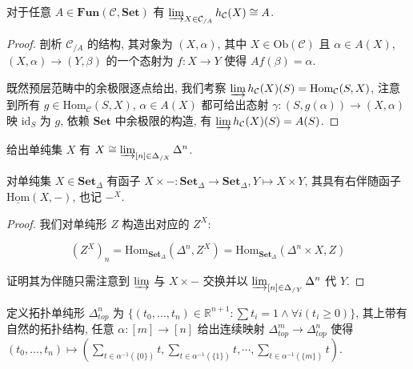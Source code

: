 \begin{lemma}
    对于任意 \(A \in \mathbf{Fun} (\mathcal{C},\mathbf{Set})\) 有 \(\varinjlim_{X \in \mathcal{C}_{/A}} h_{\mathcal{C}} (X) \cong A\).

    \begin{proof}
        剖析 \(\mathcal{C}_{/A}\) 的结构, 其对象为 \((X,\alpha)\), 其中 \(X \in \mathrm{Ob} (\mathcal{C})\) 且 \(\alpha \in A(X)\),
        \((X,\alpha) \to (Y,\beta)\) 的一个态射为 \(f : X \to Y\) 使得 \(Af (\beta) = \alpha\).

        既然预层范畴中的余极限逐点给出, 我们考察 \(\varinjlim h_{\mathcal{C}} (X) (S) = \mathrm{Hom}_{\mathcal{C}} (S,X)\),
        注意到所有 \(g \in \mathrm{Hom}_{\mathcal{C}} (S,X)\), \(\alpha \in A (X)\) 都可给出态射 \(\gamma : (S,g(\alpha)) \to (X,\alpha)\) 映 \(\mathrm{id}_S\) 为 \(g\),
        依赖 \(\mathbf{Set}\) 中余极限的构造, 有 \(\varinjlim h_{\mathcal{C}} (X) (S) = A (S)\).
    \end{proof}
\end{lemma}

\begin{corollary}
    给出单纯集 \(X\) 有 \(X \cong \varinjlim_{[n] \in \Delta_{/X}} \Delta^n\).
\end{corollary}

\begin{lemma}
    对单纯集 \(X \in \mathbf{Set}_{\Delta}\) 有函子 \(X \times - : \mathbf{Set}_{\Delta} \to \mathbf{Set}_{\Delta}, Y \mapsto X \times Y\),
    其具有右伴随函子 \(\underline{\mathrm{Hom}} (X, -)\), 也记 \(-^X\).

    \begin{proof}
        我们对单纯形 \(Z\) 构造出对应的 \(Z^X\):

        \[
            {(Z^X)}_n = \mathrm{Hom}_{\mathbf{Set}_{\Delta}} (\Delta^n, Z^X) = \mathrm{Hom}_{\mathbf{Set}_{\Delta}} (\Delta^n \times X, Z)
        \]

        证明其为伴随只需注意到 \(\varinjlim\) 与 \(X \times -\) 交换并以 \(\varinjlim_{[n] \in \Delta_{/Y}} \Delta^n\) 代 \(Y\).
    \end{proof}
\end{lemma}

\begin{definition}
    定义拓扑单纯形 \(\Delta^n_{top}\) 为 \(\{(t_0,\ldots,t_n) \in \mathbb{R}^{n+1} : \sum t_i = 1 \land \forall i (t_i \geq 0)\}\),
    其上带有自然的拓扑结构, 任意 \(\alpha : [m] \to [n]\) 给出连续映射 \(\Delta^m_{top} \to \Delta^n_{top}\) 使得 \((t_0,\ldots,t_n) \mapsto (\sum_{t \in \alpha^{-1} (\{0\})} t,\sum_{t \in \alpha^{-1} (\{1\})} t,\cdots,\sum_{t \in \alpha^{-1} (\{m\})} t)\).
\end{definition}


